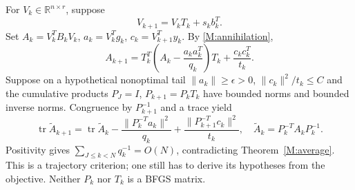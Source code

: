 \documentclass[10pt,oneside,openany]{book}
\theoremstyle{remark}\newtheorem{remark}{Remark}[chapter]
\begin{document}
For $V_k\in\mathbb R^{n\times r}$, suppose
\[
 V_{k+1}=V_kT_k+s_kb_k^T.
\]
Set $A_k=V_k^TB_kV_k$, $a_k=V_k^Tg_k$, $c_k=V_{k+1}^Ty_k$. By \eqref{M:annihilation},
\begin{equation}\label{M:frameidentity}
 A_{k+1}=T_k^T\left(A_k-\frac{a_ka_k^T}{q_k}\right)T_k+\frac{c_kc_k^T}{t_k}.
\end{equation}
Suppose on a hypothetical nonoptimal tail $\|a_k\|\ge\epsilon>0$, $\|c_k\|^2/t_k\le C$ and the cumulative products $P_J=I$, $P_{k+1}=P_kT_k$ have bounded norms and bounded inverse norms. Congruence by $P_{k+1}^{-1}$ and a trace yield
\[
 \operatorname{tr}\widetilde A_{k+1}=\operatorname{tr}\widetilde A_k
 -\frac{\|P_k^{-T}a_k\|^2}{q_k}
 +\frac{\|P_{k+1}^{-T}c_k\|^2}{t_k},\quad
 \widetilde A_k=P_k^{-T}A_kP_k^{-1}.
\]
Positivity gives $\sum_{J\le k<N}q_k^{-1}=O(N)$, contradicting Theorem~\ref{M:average}. This is a trajectory criterion; one still has to derive its hypotheses from the objective. Neither $P_k$ nor $T_k$ is a BFGS matrix.
\end{document}
